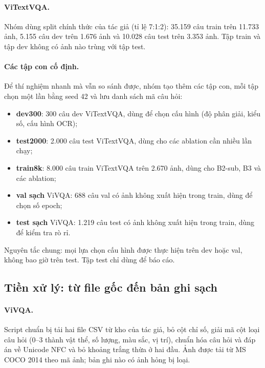 \paragraph{ViTextVQA.} Nhóm dùng split chính thức của tác giả (tỉ lệ 7:1:2):
35.159 câu train trên 11.733 ảnh, 5.155 câu dev trên 1.676 ảnh và 10.028 câu test
trên 3.353 ảnh. Tập train và tập dev không có ảnh nào trùng với tập test.

\paragraph{Các tập con cố định.} Để thí nghiệm nhanh mà vẫn so sánh được, nhóm
tạo thêm các tập con, mỗi tập chọn một lần bằng seed 42 và lưu danh sách mã câu
hỏi:
\begin{itemize}
  \item \textbf{dev300}: 300 câu dev ViTextVQA, dùng để chọn cấu hình (độ phân
  giải, kiểu số, cấu hình OCR);
  \item \textbf{test2000}: 2.000 câu test ViTextVQA, dùng cho các ablation cần
  nhiều lần chạy;
  \item \textbf{train8k}: 8.000 câu train ViTextVQA trên 2.670 ảnh, dùng cho
  B2-sub, B3 và các ablation;
  \item \textbf{val sạch} ViVQA: 688 câu val có ảnh không xuất hiện trong train,
  dùng để chọn số epoch;
  \item \textbf{test sạch} ViVQA: 1.219 câu test có ảnh không xuất hiện trong
  train, dùng để kiểm tra rò rỉ.
\end{itemize}

Nguyên tắc chung: mọi lựa chọn cấu hình được thực hiện trên dev hoặc val, không
bao giờ trên test. Tập test chỉ dùng để báo cáo.

\subsection{Tiền xử lý: từ file gốc đến bản ghi sạch}
\label{sec:met-prep}

\paragraph{ViVQA.} Script chuẩn bị tải hai file CSV từ kho của tác giả, bỏ cột chỉ
số, giải mã cột loại câu hỏi (0--3 thành vật thể, số lượng, màu sắc, vị trí),
chuẩn hóa câu hỏi và đáp án về Unicode NFC và bỏ khoảng trắng thừa ở hai đầu.
Ảnh được tải từ MS COCO 2014 theo mã ảnh; bản ghi nào có ảnh hỏng bị loại.

